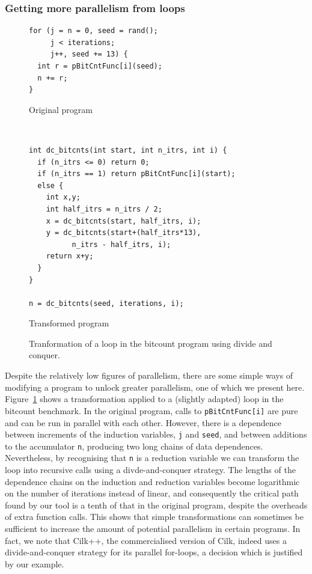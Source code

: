 \subsubsection{Getting more parallelism from loops}

\begin{figure}
  \centering
  \begin{subfloat}
    \begin{minipage}{3in}
      \begin{verbatim}
for (j = n = 0, seed = rand();
     j < iterations;
     j++, seed += 13) {
  int r = pBitCntFunc[i](seed);
  n += r;
}
      \end{verbatim}
    \end{minipage}%
    \label{orig}
    \caption{Original program}
  \end{subfloat}%
\\
  \begin{subfloat}
    \label{dnc-trans}
    \begin{minipage}{3in}
      \begin{verbatim}
int dc_bitcnts(int start, int n_itrs, int i) {
  if (n_itrs <= 0) return 0;
  if (n_itrs == 1) return pBitCntFunc[i](start);
  else {
    int x,y;
    int half_itrs = n_itrs / 2;
    x = dc_bitcnts(start, half_itrs, i);
    y = dc_bitcnts(start+(half_itrs*13),
          n_itrs - half_itrs, i);
    return x+y;
  }
}

n = dc_bitcnts(seed, iterations, i);
      \end{verbatim}
    \end{minipage}%
    \caption{Transformed program}
  \end{subfloat}%
  \caption{Tranformation of a loop in the bitcount program using divide and conquer.}
  \label{dnc}
\end{figure}

Despite the relatively low figures of parallelism, there are some simple ways of modifying a program to unlock greater parallelism, one of which we present here.
Figure~\ref{dnc} shows a transformation applied to a (slightly adapted) loop in the bitcount benchmark.
In the original program, calls to \texttt{pBitCntFunc[i]} are pure and can be run in parallel with each other.
However, there is a dependence between increments of the induction variables, \texttt{j} and \texttt{seed}, and between additions to the accumulator \texttt{n}, producing two long chains of data dependences.
Nevertheless, by recognising that \texttt{n} is a reduction variable we can transform the loop into recursive calls using a divde-and-conquer strategy.
The lengths of the dependence chains on the induction and reduction variables become logarithmic on the number of iterations instead of linear, and consequently the critical path found by our tool is a tenth of that in the original program, despite the overheads of extra function calls.
This shows that simple transformations can sometimes be sufficient to increase the amount of potential parallelism in certain programs.
In fact, we note that Cilk++, the commercialised version of Cilk, indeed uses a divide-and-conquer strategy for its parallel for-loops, a decision which is justified by our example.

